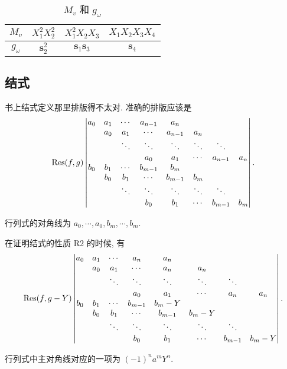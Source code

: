 \documentclass[color=black,device=normal,lang=cn,mode=geye]{elegantnote}
\begin{document}
\begin{table}\caption{$M_v$ 和 $g_\omega$}\label{tb1}
    \centering
    \begin{tabular}{c|ccc}
        $M_v$      & $X_1^2X_2^2$ & $X_1^2X_2X_3$ & $X_1X_2X_3X_4$ \\
        \hline
        $g_\omega$ & $\mathbf{s}_2^2$ & $\mathbf{s}_1\mathbf{s}_3$ & $\mathbf{s}_4$ \\
    \end{tabular}
\end{table}
\subsection{结式}
书上结式定义那里排版得不太对. 准确的排版应该是
\[\operatorname{Res} (f,g)\begin{vmatrix}
    a_0 & a_1 & \cdots & a_{n-1} & a_n \\
    & a_0 & a_1 & \cdots & a_{n-1} & a_n \\
    && \ddots & \ddots & \ddots & \ddots & \ddots \\
    &&& a_0 & a_1 & \cdots & a_{n-1} & a_n \\
    b_0 & b_1 & \cdots & b_{m-1} & b_m \\
    & b_0 & b_1 & \cdots & b_{m-1} & b_m \\
    && \ddots & \ddots & \ddots & \ddots & \ddots \\
    &&& b_0 & b_1 & \cdots & b_{m-1} & b_m \\
\end{vmatrix}.\]

行列式的对角线为 $a_0,\cdots,a_0,b_m,\cdots,b_m$.

在证明结式的性质 R2 的时候, 有
\[\operatorname{Res} (f,g-Y)\begin{vmatrix}
    a_0 & a_1 & \cdots & a_n & a_n \\
    & a_0 & a_1 & \cdots & a_n & a_n \\
    && \ddots & \ddots & \ddots & \ddots & \ddots \\
    &&& a_0 & a_1 & \cdots & a_n & a_n \\
    b_0 & b_1 & \cdots & b_{m-1} & b_m-Y \\
    & b_0 & b_1 & \cdots & b_{m-1} & b_m-Y \\
    && \ddots & \ddots & \ddots & \ddots & \ddots \\
    &&& b_0 & b_1 & \cdots & b_{m-1} & b_m-Y \\
\end{vmatrix}.\]

行列式中主对角线对应的一项为 $(-1)^na^mY^n$.
\end{document}
